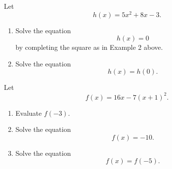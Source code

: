\documentclass{ximera}
\begin{document}
\begin{exercise}  \label{ECPFEERE}
Let 
\[
 h(x) = 5x^2 + 8x - 3 .
\]

\begin{enumerate}
\item Solve the equation
\[
     h(x) = 0 
\]
by completing the square as in Example 2 above.

\item Solve the equation
\[
  h(x) = h(0) .
\]
\end{enumerate}

\end{exercise}

\begin{exercise} \label{EXMf392013}
Let
\[
    f(x) = 16x - 7(x+1)^2 .
\]

\begin{enumerate}
\item Evaluate $f(-3)$.

\item Solve the equation 
\[
      f(x) = -10 .
\]

\item Solve the equation
\[
   f(x) = f(-5).
\]
\end{enumerate}
\end{exercise}
\end{document}
